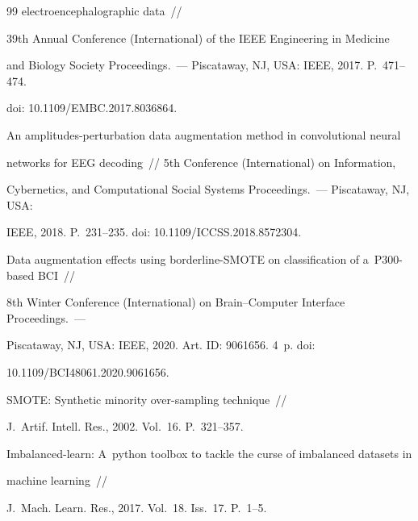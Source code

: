 {{\begin{thebibliography}{99}
electroencephalographic data~/\!\!/

39th Annual  Conference (International) of the IEEE Engineering in Medicine 

and Biology Society Proceedings.~--- Piscataway, NJ, USA: IEEE, 2017. P.~471--474. 

doi: 10.1109\!/\!EMBC.2017.8036864.





An amplitudes-perturbation data augmentation method in convolutional neural 

networks for EEG decoding~/\!\!/ 5th  Conference (International) on Information, 

Cybernetics, and Computational Social Systems Proceedings.~--- Piscataway, NJ, USA: 

IEEE, 2018. P.~231--235. doi: 10.1109\!/\!ICCSS.2018.8572304.





Data augmentation effects using borderline-SMOTE on classification of a~P300-based BCI~/\!\!/

8th  Winter Conference (International) on Brain--Computer Interface Proceedings.~--- 

Piscataway, NJ, USA: IEEE, 2020. Art. ID: 9061656. 4~p. doi: 

10.1109\!/\!BCI48061.2020.9061656.





SMOTE: Synthetic minority over-sampling technique~/\!\!/

J.~Artif. Intell. Res., 2002. Vol.~16. P.~321--357.





Imbalanced-learn: A~python toolbox to tackle the curse of imbalanced datasets in 

machine learning~/\!\!/

J.~Mach. Learn. Res., 2017. Vol.~18. Iss.~17. P.~1--5.





\end{thebibliography}}}
